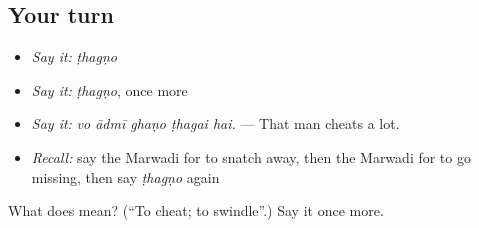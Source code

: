 \subsection*{Your turn}
\begin{itemize}
\raggedright
  \item \emph{Say it:} \emph{ṭhagṇo}
  \item \emph{Say it:} \emph{ṭhagṇo}, once more
  \item \emph{Say it:} \emph{vo ādmī ghaṇo ṭhagai hai.} — That man cheats a lot.
  \item \emph{Recall:} say the Marwadi for to snatch away, then the Marwadi for to go missing, then say \emph{ṭhagṇo} again
\end{itemize}

\begin{tcolorbox}[breakable,colback=teal!4,colframe=teal!35!black,title={Before you move on}]
What does  mean? (\textquotedblleft{}To cheat; to swindle\textquotedblright{}.) Say it once more.
\end{tcolorbox}
